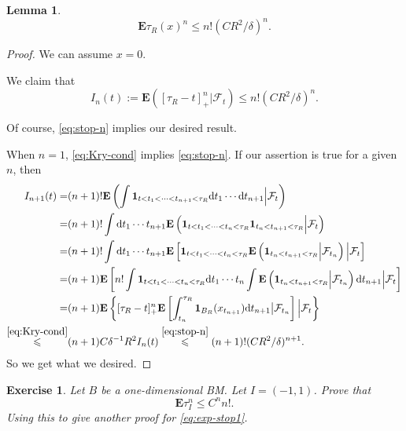 \documentclass[twoside, 12pt]{book}
\numberwithin{equation}{chapter}
\newtheorem{lemma}[theorem]{Lemma}
\newtheorem{exercise}{Exercise}[section]
\def\cF{{\mathcal F}}
\def\bE{{\mathbf E}}
\def\l{\left}
\def\r{\right}
\def\leq{\leqslant}
\def\1{{\mathbf{1}}}
\def\d{\text{\rm{d}}}
\begin{document}
	\begin{lemma}
	    \[
		  \bE {\tau_R(x)}^n \leq n! (CR^2/\delta)^{n}. 
        \]
	\end{lemma}
	\begin{proof}
        We can assume $x=0$. 
        \begin{framed}
            We claim that 
            \begin{equation}\label{eq:stop-n}
		      I_n(t):= \bE \l( [\tau_R-t]_+^n |\cF_t\r) \leq n! (CR^2/\delta)^{n}. 
		    \end{equation}
        \end{framed}
        Of course, \eqref{eq:stop-n} implies our desired result. 
        
		When $n=1$, \eqref{eq:Kry-cond} implies \eqref{eq:stop-n}. If our assertion is true for a given $n$, then 
        \begin{equation*}
            \begin{aligned}
                I_{n+1}(t)=& (n+1)! \bE \l( \int \1_{t<t_1<\cdots<t_{n+1}<\tau_R} \d t_1\cdots \d t_{n+1} \Big | \cF_t\r)\\
                =& (n+1)! \int \d t_1\cdots t_{n+1} \bE \l( \1_{t<t_1<\cdots<t_n<\tau_R} \1_{t_n<t_{n+1}<\tau_R} \Big| \cF_t\r)\\
                =& (n+1)! \int \d t_1\cdots t_{n+1} \bE \l[ \1_{t<t_1<\cdots<t_n<\tau_R} \bE \l(\1_{t_n<t_{n+1}<\tau_R}\Big| \cF_{t_{n}}\r) \Big| \cF_t\r]\\
                =& (n+1) \bE \l[ n!\int \1_{t<t_1<\cdots<t_n<\tau_R} \d t_1\cdots t_{n}  \int \bE \l(\1_{t_n<t_{n+1}<\tau_R}\Big| \cF_{t_{n}}\r) \d t_{n+1}\Big| \cF_t\r]\\
                =& (n+1) \bE \l\{  [\tau_R-t]_+^n \bE \l[\int_{t_n}^{\tau_R} \1_{B_R}(x_{t_{n+1}}) \d t_{n+1} \big| \cF_{t_n} \r] \Big|\cF_t \r\}\\
                \overset{\eqref{eq:Kry-cond}}{\leq} & (n+1)C\delta^{-1}R^2 I_n(t)\overset{\eqref{eq:stop-n}}{\leq} (n+1)! (CR^2/\delta)^{n+1}. 
            \end{aligned}
        \end{equation*}
        So we get what we desired. 
	\end{proof}
	
	\begin{exercise}
		Let $B$ be a one-dimensional BM. Let $I=(-1,1)$. Prove  that 
        \[
            \bE \tau_I^n\leq C^n n!. 
        \]
        Using this to give another proof for \eqref{eq:exp-stop1}. 
	\end{exercise}
	
\end{document}
